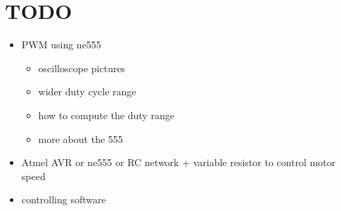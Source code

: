 \documentclass[12pt]{article}
\begin{document}
\section{TODO}

\begin{itemize}
\item PWM using ne555
\begin{itemize}
  \item oscilloscope pictures
  \item wider duty cycle range
  \item how to compute the duty range
  \item more about the 555
\end{itemize}
\item Atmel AVR or ne555 or RC network + variable resistor to control motor speed
\item controlling software 
\end{itemize}
\end{document}
